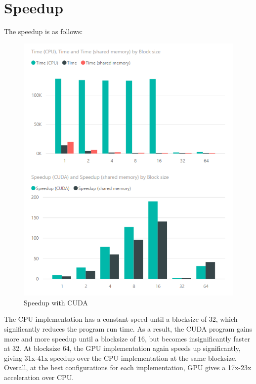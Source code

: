 \documentclass[12pt]{article}
\begin{document}

\section{Speedup}

The speedup is as follows:

\begin{figure}[h]
    \centering
    \caption{Speedup with CUDA}
    \includegraphics{pics/lw5.png}
\end{figure}

The CPU implementation has a constant speed until a blocksize of 32, which significantly reduces the program run time.
As a result, the CUDA program gains more and more speedup until a blocksize of 16, but becomes insignificantly faster at 32.
At blocksize 64, the GPU implementation again speeds up significantly, giving 31x-41x speedup over the CPU implementation at the same blocksize.
Overall, at the best configurations for each implementation, GPU gives a 17x-23x acceleration over CPU.

\end{document}
